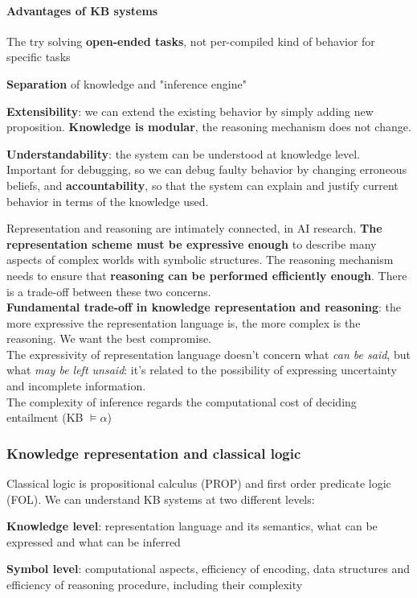 \documentclass[10pt]{report}
\begin{document}
\paragraph{Advantages of KB systems}
\begin{list}{}{}
	\item The try solving \textbf{open-ended tasks}, not per-compiled kind of behavior for specific tasks
	\item \textbf{Separation} of knowledge and "inference engine"
	\item \textbf{Extensibility}: we can extend the existing behavior by simply adding new proposition. \textbf{Knowledge is modular}, the reasoning mechanism does not change.
	\item \textbf{Understandability}: the system can be understood at knowledge level. Important for debugging, so we can debug faulty behavior by changing erroneous beliefs, and \textbf{accountability}, so that the system can explain and justify current behavior in terms of the knowledge used.
\end{list}
Representation and reasoning are intimately connected, in AI research. \textbf{The representation scheme must be expressive enough} to describe many aspects of complex worlds with symbolic structures. The reasoning mechanism needs to ensure that \textbf{reasoning can be performed efficiently enough}. There is a trade-off between these two concerns.\\
\textbf{Fundamental trade-off in knowledge representation and reasoning}: the more expressive the representation language is, the more complex is the reasoning. We want the best compromise.\\
The expressivity of representation language doesn't concern what \textit{can be said}, but what \textit{may be left unsaid}: it's related to the possibility of expressing uncertainty and incomplete information.\\
The complexity of inference regards the computational cost of deciding entailment (KB $\vDash \alpha$)
\subsubsection{Knowledge representation and classical logic}
Classical logic is propositional calculus (PROP) and first order predicate logic (FOL). We can understand KB systems at two different levels:
\begin{list}{}{}
	\item \textbf{Knowledge level}: representation language and its semantics, what can be expressed and what can be inferred
	\item \textbf{Symbol level}: computational aspects, efficiency of encoding, data structures and efficiency of reasoning procedure, including their complexity
\end{list}
\end{document}
